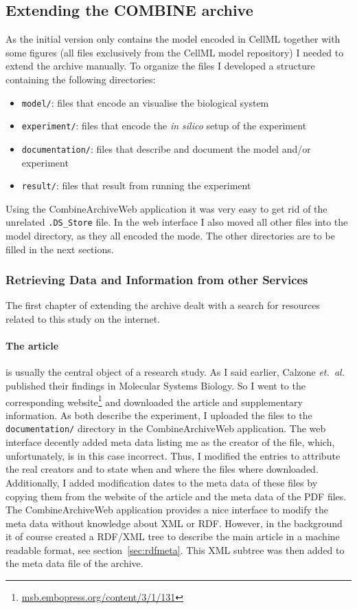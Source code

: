 \subsection{Extending the COMBINE archive}
\label{sec:extendingarchive}
As the initial version only contains the model encoded in CellML together with some figures (all files exclusively from the CellML model repository) I needed to extend the archive manually.
To organize the files I developed a structure containing the following directories:
\begin{itemize}
 \item \texttt{model/}: files that encode an visualise the biological system
 \item \texttt{experiment/}: files that encode the \textit{in silico} setup of the experiment
 \item \texttt{documentation/}: files that describe and document the model and/or experiment
 \item \texttt{result/}: files that result from running the experiment
\end{itemize}

Using the CombineArchiveWeb application it was very easy to get rid of the unrelated \texttt{.DS\_Store} file. In the web interface I also moved all other files into the model directory, as they all encoded the mode.
The other directories are to be filled in the next sections.

\subsubsection{Retrieving Data and Information from other Services}
The first chapter of extending the archive dealt with a search for resources related to this study on the internet.

\paragraph{The article} is usually the central object of a research study. As I said earlier, Calzone \emph{et.~al.} published their findings in Molecular Systems Biology. So I went to the corresponding website\footnote{\href{http://msb.embopress.org/content/3/1/131}{msb.embopress.org/content/3/1/131}} and downloaded the article and supplementary information.
As both describe the experiment, I uploaded the files to the \texttt{documentation/} directory in the CombineArchiveWeb application.
The web interface decently added meta data listing me as the creator of the file, which, unfortunately, is in this case incorrect.
Thus, I modified the entries to attribute the real creators and to state when and where the files where downloaded.
Additionally, I added modification dates to the meta data of these files by copying them from the website of the article and the meta data of the PDF files.
The CombineArchiveWeb application provides a nice interface to modify the meta data without knowledge about XML or RDF.
However, in the background it of course created a RDF/XML tree to describe the main article in a machine readable format, see section~\ref{sec:rdfmeta}.
This XML subtree was then added to the meta data file of the archive.


